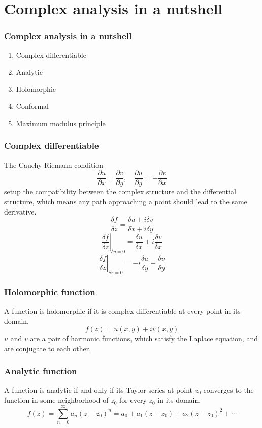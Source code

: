 \documentclass[aspectratio=169]{beamer}
\begin{document}
\section{Complex analysis in a nutshell}

\begin{frame}
    \frametitle{Complex analysis in a nutshell}
    \begin{enumerate}
        \item Complex differentiable
        \item Analytic
        \item Holomorphic
        \item Conformal
        \item Maximum modulus principle
    \end{enumerate}
\end{frame}

\begin{frame}
    \frametitle{Complex differentiable}
    The Cauchy-Riemann condition
    \[
        \frac{\partial u}{\partial x} = \frac{\partial v}{\partial y}, \quad \frac{\partial u}{\partial y} = - \frac{\partial v}{\partial x}
    \]
    setup the compatibility between the complex structure and the differential structure, which means any path approaching
    a point should lead to the same derivative.
    \[
        \frac{\delta f}{\delta z} = \frac{\delta u + i \delta v}{\delta x + i \delta y}
    \]
    \[
        \left. \frac{\delta f}{\delta z} \right \rvert_{\delta y=0}= \frac{\delta u}{\delta x} + i \frac{\delta v}{\delta x}
    \]
    \[
        \left. \frac{\delta f}{\delta z} \right \rvert_{\delta x=0} = - i \frac{\delta u}{\delta y} + \frac{\delta v}{\delta y}
    \]
\end{frame}

\begin{frame}
    \frametitle{Holomorphic function}
    A function is holomorphic if it is complex differentiable at every point in its domain.
    \[
        f(z) = u(x, y) + i v(x, y)
    \]
    $u$ and $v$ are a pair of harmonic functions, which satisfy the Laplace equation, and are conjugate to each other.
\end{frame}

\begin{frame}
    \frametitle{Analytic function}
    A function is analytic if and only if its Taylor series at point $z_0$ converges to the function in some neighborhood of $z_0$
    for every $z_0$ in its domain.
    \[
        f(z) = \sum_{n=0}^\infty a_{n} \left( z-z_0 \right)^{n} = a_0 + a_1 (z-z_0) + a_2 (z-z_0)^2 + \cdots
    \]
\end{frame}
\end{document}
